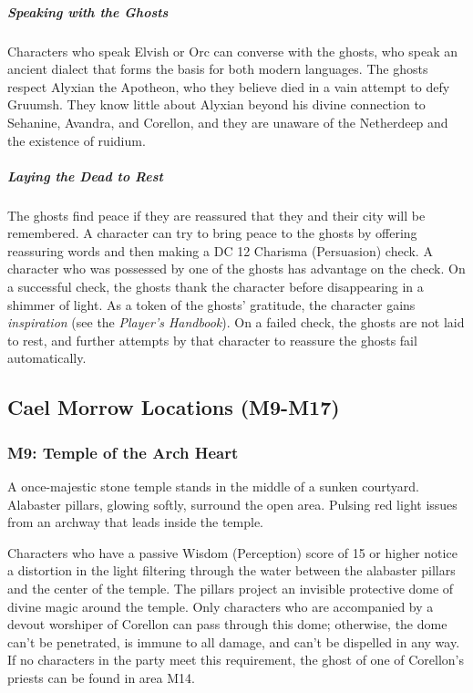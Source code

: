 \documentclass[10pt,a4paper,twoside,bg=print,twocolumn,openany,nodeprecatedcode]{dndbook}
\begin{document}
\subparagraph{Speaking with the Ghosts}
Characters who speak Elvish or Orc can converse with the ghosts, who speak an ancient dialect that forms the basis for both modern languages. The ghosts respect Alyxian the Apotheon, who they believe died in a vain attempt to defy Gruumsh. They know little about Alyxian beyond his divine connection to Sehanine, Avandra, and Corellon, and they are unaware of the Netherdeep and the existence of ruidium.

\subparagraph{Laying the Dead to Rest}
The ghosts find peace if they are reassured that they and their city will be remembered. A character can try to bring peace to the ghosts by offering reassuring words and then making a DC 12 Charisma (Persuasion) check. A character who was possessed by one of the ghosts has advantage on the check. On a successful check, the ghosts thank the character before disappearing in a shimmer of light. As a token of the ghosts' gratitude, the character gains \textit{inspiration} (see the \textit{Player's Handbook}). On a failed check, the ghosts are not laid to rest, and further attempts by that character to reassure the ghosts fail automatically.

\subsection{Cael Morrow Locations (M9-M17)}
\subsubsection{M9: Temple of the Arch Heart}
\begin{DndReadAloud}{}
A once-majestic stone temple stands in the middle of a sunken courtyard. Alabaster pillars, glowing softly, surround the open area. Pulsing red light issues from an archway that leads inside the temple.

\end{DndReadAloud}

Characters who have a passive Wisdom (Perception) score of 15 or higher notice a distortion in the light filtering through the water between the alabaster pillars and the center of the temple. The pillars project an invisible protective dome of divine magic around the temple. Only characters who are accompanied by a devout worshiper of Corellon can pass through this dome; otherwise, the dome can't be penetrated, is immune to all damage, and can't be dispelled in any way. If no characters in the party meet this requirement, the ghost of one of Corellon's priests can be found in area M14.
\end{document}
